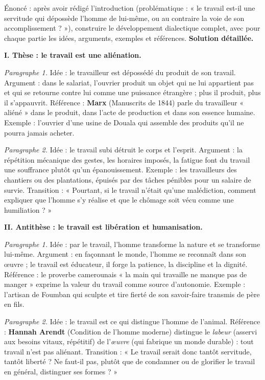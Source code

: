 \documentclass[11pt]{article}
\begin{document}
\begin{exoresolu}
Énoncé : après avoir rédigé l'introduction (problématique : « le travail est-il une servitude qui dépossède l'homme de lui-même, ou au contraire la voie de son accomplissement ? »), construire le développement dialectique complet, avec pour chaque partie les idées, arguments, exemples et références.
\tcblower
\textbf{Solution détaillée.}
\par\smallskip
\textbf{I. Thèse : le travail est une aliénation.}
\par
\emph{Paragraphe 1.} Idée : le travailleur est dépossédé du produit de son travail. Argument : dans le salariat, l'ouvrier produit un objet qui ne lui appartient pas et qui se retourne contre lui comme une puissance étrangère ; plus il produit, plus il s'appauvrit. Référence : \textbf{Marx} (Manuscrits de 1844) parle du travailleur « aliéné » dans le produit, dans l'acte de production et dans son essence humaine. Exemple : l'ouvrier d'une usine de Douala qui assemble des produits qu'il ne pourra jamais acheter.
\par
\emph{Paragraphe 2.} Idée : le travail subi détruit le corps et l'esprit. Argument : la répétition mécanique des gestes, les horaires imposés, la fatigue font du travail une souffrance plutôt qu'un épanouissement. Exemple : les travailleurs des chantiers ou des plantations, épuisés par des tâches pénibles pour un salaire de survie. Transition : « Pourtant, si le travail n'était qu'une malédiction, comment expliquer que l'homme s'y réalise et que le chômage soit vécu comme une humiliation ? »
\par\smallskip
\textbf{II. Antithèse : le travail est libération et humanisation.}
\par
\emph{Paragraphe 1.} Idée : par le travail, l'homme transforme la nature et se transforme lui-même. Argument : en façonnant le monde, l'homme se reconnaît dans son œuvre ; le travail est éducateur, il forge la patience, la discipline et la dignité. Référence : le proverbe camerounais « la main qui travaille ne manque pas de manger » exprime la valeur du travail comme source d'autonomie. Exemple : l'artisan de Foumban qui sculpte et tire fierté de son savoir-faire transmis de père en fils.
\par
\emph{Paragraphe 2.} Idée : le travail est ce qui distingue l'homme de l'animal. Référence : \textbf{Hannah Arendt} (Condition de l'homme moderne) distingue le \emph{labeur} (asservi aux besoins vitaux, répétitif) de l'\emph{œuvre} (qui fabrique un monde durable) : tout travail n'est pas aliénant. Transition : « Le travail serait donc tantôt servitude, tantôt liberté ? Ne faut-il pas, plutôt que de condamner ou de glorifier le travail en général, distinguer ses formes ? »

\end{exoresolu}
\end{document}
